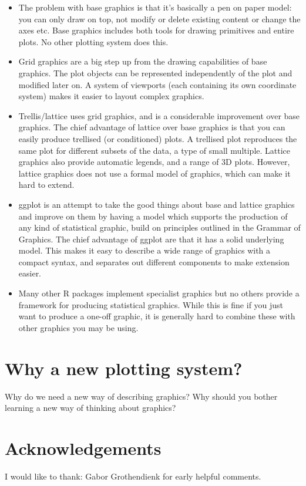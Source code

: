 \begin{itemize} 
	\item The problem with base graphics is that it's basically a pen on paper model: you can only draw on top, not modify or delete existing content or change the axes etc.  Base graphics includes both tools for drawing primitives and entire plots. No other plotting system does this.

	\item Grid graphics are a big step up from the drawing capabilities of base graphics. The plot objects can be represented independently of the plot and modified later on. A system of viewports (each containing its own coordinate system) makes it easier to layout complex graphics.

	\item Trellis/lattice uses grid graphics, and is a considerable improvement over base graphics.  The chief advantage of lattice over base graphics is that you can easily produce trellised (or conditioned) plots.  A trellised plot reproduces the same plot for different subsets of the data, a type of small multiple.  Lattice graphics also provide automatic legends, and a range of 3D plots.  However, lattice graphics does not use a formal model of graphics, which can make it hard to extend.

	\item ggplot is an attempt to take the good things about base and lattice graphics and improve on them by having a model which supports the production of any kind of statistical graphic, build on principles outlined in the Grammar of Graphics.  The chief advantage of ggplot are that it has a solid underlying model.  This makes it easy to describe a wide range of graphics with a compact syntax, and separates out different components to make extension easier.

	\item Many other R packages implement specialist graphics but no others provide a framework for producing statistical graphics. While this is fine if you just want to produce a one-off graphic, it is generally hard to combine these with other graphics you may be using.
\end{itemize}

\section{Why a new plotting system?}\label{sec:why_a_new_plotting_system_} 

Why do we need a new way of describing graphics?  Why should you bother learning a new way of thinking about graphics?

\section{Acknowledgements}\label{sec:acknolwedgements}

I would like to thank: Gabor Grothendienk for early helpful comments.


